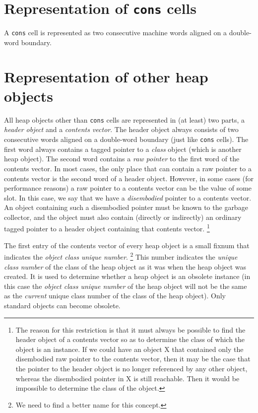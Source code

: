 \section{Representation of \texttt{cons} cells}

A \texttt{cons} cell is represented as two consecutive machine
words aligned on a double-word boundary.

\section{Representation of other heap objects}
\label{sec-data-representation-other-heap-objects}

All heap objects other than \texttt{cons} cells are represented in (at
least) two parts, a \emph{header object} and a \emph{contents vector}.
The header object always consists of two consecutive words aligned on
a double-word boundary (just like \texttt{cons} cells).  The first
word always contains a tagged pointer to a \emph{class} object (which
is another heap object).  The second word contains a \emph{raw
  pointer} to the first word of the contents vector.  In most cases,
the only place that can contain a raw pointer to a contents vector is
the second word of a header object.  However, in some cases (for
performance reasons) a raw pointer to a contents vector can be the
value of some slot.  In this case, we say that we have a
\emph{disembodied} pointer to a contents vector.  An object containing
such a disembodied pointer must be known to the garbage collector, and
the object must also contain (directly or indirectly) an ordinary
tagged \cl{} pointer to a header object containing that contents
vector.%
\footnote{The reason for this restriction is that it must always be possible
  to find the header object of a contents vector so as to determine
  the class of which the object is an instance.  If we could have
  an object X that contained only the disembodied raw pointer to the
  contents vector, then it may be the case that the pointer to the
  header object is no longer referenced by any other object, whereas
  the disembodied pointer in X is still reachable.  Then it would be
  impossible to determine the class of the object.}

The first entry of the contents vector of every heap object is a small
fixnum that indicates the \emph{object class unique number}.%
\footnote{We need to find a better name for this concept.}
This number indicates the \emph{unique class number} of the class of
the heap object as it was when the heap object was created.  It is
used to determine whether a heap object is an obsolete instance (in
this case the \emph{object class unique number} of the heap object
will not be the same as the \emph{current} unique class number of the
class of the heap object).  Only standard objects can become
obsolete. 

